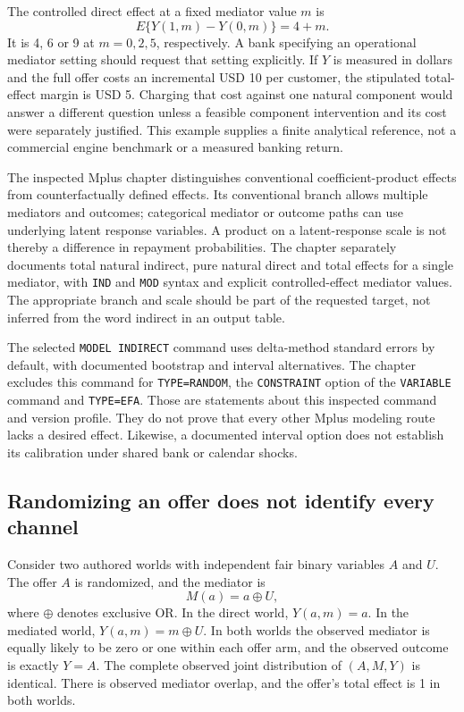 The controlled direct effect at a fixed mediator value $m$ is
\begin{equation}
 E\{Y(1,m)-Y(0,m)\}=4+m.
 \label{exec20:med-controlled}
\end{equation}
It is 4, 6 or 9 at $m=0,2,5$, respectively. A bank specifying an operational mediator setting should request that setting explicitly. If $Y$ is measured in dollars and the full offer costs an incremental USD 10 per customer, the stipulated total-effect margin is USD 5. Charging that cost against one natural component would answer a different question unless a feasible component intervention and its cost were separately justified. This example supplies a finite analytical reference, not a commercial engine benchmark or a measured banking return.

The inspected Mplus chapter distinguishes conventional coefficient-product effects from counterfactually defined effects. Its conventional branch allows multiple mediators and outcomes; categorical mediator or outcome paths can use underlying latent response variables. A product on a latent-response scale is not thereby a difference in repayment probabilities. The chapter separately documents total natural indirect, pure natural direct and total effects for a single mediator, with \texttt{IND} and \texttt{MOD} syntax and explicit controlled-effect mediator values. The appropriate branch and scale should be part of the requested target, not inferred from the word indirect in an output table.~\citep{exec20_med_mplus_ch17}

The selected \texttt{MODEL INDIRECT} command uses delta-method standard errors by default, with documented bootstrap and interval alternatives. The chapter excludes this command for \texttt{TYPE=RANDOM}, the \texttt{CONSTRAINT} option of the \texttt{VARIABLE} command and \texttt{TYPE=EFA}. Those are statements about this inspected command and version profile. They do not prove that every other Mplus modeling route lacks a desired effect. Likewise, a documented interval option does not establish its calibration under shared bank or calendar shocks.

\subsection{Randomizing an offer does not identify every channel}
\label{exec20:med-nonidentification}
Consider two authored worlds with independent fair binary variables $A$ and $U$. The offer $A$ is randomized, and the mediator is
\begin{equation}
 M(a)=a\mathbin{\oplus}U,
 \label{exec20:med-xor}
\end{equation}
where $\oplus$ denotes exclusive OR. In the direct world, $Y(a,m)=a$. In the mediated world, $Y(a,m)=m\mathbin{\oplus}U$. In both worlds the observed mediator is equally likely to be zero or one within each offer arm, and the observed outcome is exactly $Y=A$. The complete observed joint distribution of $(A,M,Y)$ is identical. There is observed mediator overlap, and the offer's total effect is 1 in both worlds.~\citep{exec20_med_reference}

